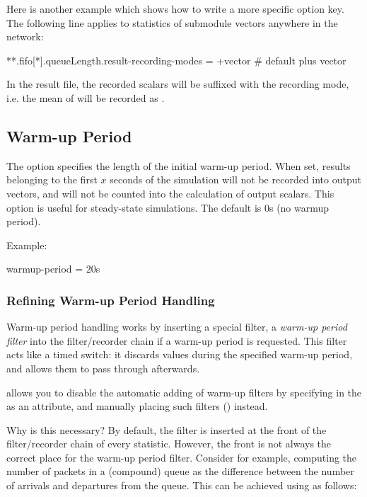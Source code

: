 Here is another example which shows how to write a more specific option
key. The following line applies to  statistics of
 submodule vectors anywhere in the network:

\begin{inifile}
**.fifo[*].queueLength.result-recording-modes = +vector  # default plus vector
\end{inifile}

In the result file, the recorded scalars will be suffixed with the recording mode,
i.e. the mean of  will be recorded as .


\subsection{Warm-up Period}
\label{sec:ana-sim:warmup-period}

The  option specifies the length of the initial
warm-up period. When set, results belonging to the first $x$ seconds
of the simulation will not be recorded into output vectors, and will
not be counted into the calculation of output scalars.
This option is useful for steady-state simulations. The default is 0s
(no warmup period).

Example:

\begin{inifile}
warmup-period = 20s
\end{inifile}


\subsubsection{Refining Warm-up Period Handling}

Warm-up period handling works by inserting a special filter, a \textit{warm-up
period filter} into the filter/recorder chain if a warm-up period is requested.
This filter acts like a timed switch: it discards values during the specified warm-up
period, and allows them to pass through afterwards.

{\opp} allows you to disable the automatic adding of warm-up filters by
specifying  in the  as an attribute,
and manually placing such filters () instead.

Why is this necessary? By default, the filter is inserted at the front of the
filter/recorder chain of every statistic. However, the front is not always the
correct place for the warm-up period filter. Consider for example, computing the
number of packets in a (compound) queue as the difference between the number of
arrivals and departures from the queue. This can be achieved using
 as follows:

